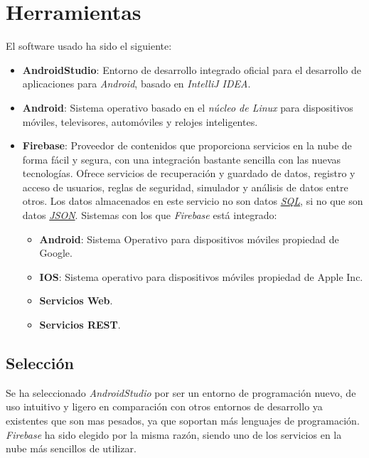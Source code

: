 %
%
%
%

\cleardoublepage
\chapter{Herramientas}
\label{chap:tools}

	El software usado ha sido el siguiente:
	\begin{itemize}
		\item {\bf AndroidStudio}\cite{1:androidstudio:online}: Entorno de desarrollo integrado oficial para el desarrollo de aplicaciones para {\it Android}, basado en {\it IntelliJ IDEA}.
		\item {\bf Android}\cite{2:android:online}: Sistema operativo basado en el {\it núcleo de Linux} para dispositivos móviles, televisores, automóviles y relojes inteligentes.
		\item {\bf Firebase}\cite{6:firebase:online}: Proveedor de contenidos que proporciona servicios en la nube de forma fácil y segura, con una integración bastante sencilla con las nuevas tecnologías. Ofrece servicios de recuperación y guardado de datos, registro y acceso de usuarios, reglas de seguridad, simulador y análisis de datos entre otros. Los datos almacenados en este servicio no son datos \href{http://es.wikipedia.org/wiki/SQL}{\textit{SQL}}, si no que son datos \href{http://es.wikipedia.org/wiki/JSON}{\textit{JSON}}\cite{7:json:online}. Sistemas con los que {\it Firebase} está integrado:
		\begin{itemize}
			\item {\bf Android}\cite{2:android:online}: Sistema Operativo para dispositivos móviles propiedad de Google.
			\item {\bf IOS}: Sistema operativo para dispositivos móviles propiedad de Apple Inc.
			\item {\bf Servicios Web}.
			\item {\bf Servicios REST}.
		\end{itemize}
	\end{itemize}
	
	\section{Selección}
	Se ha seleccionado {\it AndroidStudio} por ser un entorno de programación nuevo, de uso intuitivo y ligero en comparación con otros entornos de desarrollo ya existentes que son mas pesados, ya que soportan más lenguajes de programación. {\it Firebase} ha sido elegido por la misma razón, siendo uno de los servicios en la nube más sencillos de utilizar.
	
